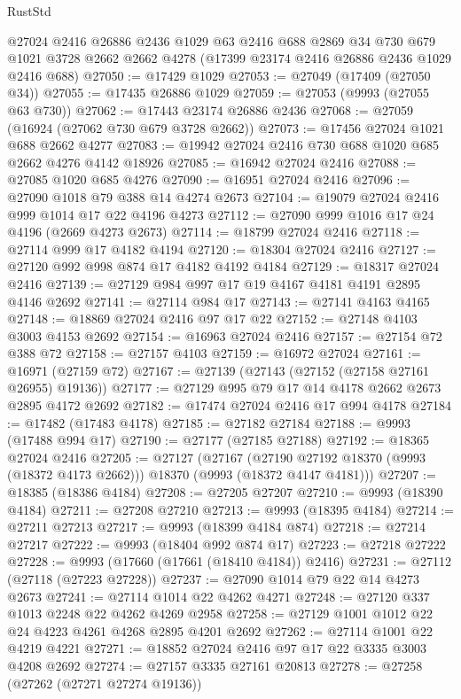 \begin{lexlean}{RustStd}
\begin{coremodule}
    @27024
    @2416
    @26886
    @2436
    @1029
    @63
    @2416
    @688
    @2869
    @34
    @730
    @679
    @1021
    @3728
    @2662
    @2662
    @4278
    (@17399 @23174 @2416 @26886 @2436 @1029 @2416 @688)
@27050 := @17429 @1029
@27053 := @27049 (@17409 (@27050 @34))
@27055 := @17435 @26886 @1029
@27059 := @27053 (@9993 (@27055 @63 @730))
@27062 := @17443 @23174 @26886 @2436
@27068 := @27059 (@16924 (@27062 @730 @679 @3728 @2662))
@27073 := @17456 @27024 @1021 @688 @2662 @4277
@27083 := @19942 @27024 @2416 @730 @688 @1020 @685 @2662 @4276 @4142 @18926
@27085 := @16942 @27024 @2416
@27088 := @27085 @1020 @685 @4276
@27090 := @16951 @27024 @2416
@27096 := @27090 @1018 @79 @388 @14 @4274 @2673
@27104 := @19079 @27024 @2416 @999 @1014 @17 @22 @4196 @4273
@27112 := @27090 @999 @1016 @17 @24 @4196 (@2669 @4273 @2673)
@27114 := @18799 @27024 @2416
@27118 := @27114 @999 @17 @4182 @4194
@27120 := @18304 @27024 @2416
@27127 := @27120 @992 @998 @874 @17 @4182 @4192 @4184
@27129 := @18317 @27024 @2416
@27139 := @27129 @984 @997 @17 @19 @4167 @4181 @4191 @2895 @4146 @2692
@27141 := @27114 @984 @17
@27143 := @27141 @4163 @4165
@27148 := @18869 @27024 @2416 @97 @17 @22
@27152 := @27148 @4103 @3003 @4153 @2692
@27154 := @16963 @27024 @2416
@27157 := @27154 @72 @388 @72
@27158 := @27157 @4103
@27159 := @16972 @27024
@27161 := @16971 (@27159 @72)
@27167 := @27139 (@27143 (@27152 (@27158 @27161 @26955) @19136))
@27177 := @27129 @995 @79 @17 @14 @4178 @2662 @2673 @2895 @4172 @2692
@27182 := @17474 @27024 @2416 @17 @994 @4178
@27184 := @17482 (@17483 @4178)
@27185 := @27182 @27184
@27188 := @9993 (@17488 @994 @17)
@27190 := @27177 (@27185 @27188)
@27192 := @18365 @27024 @2416
@27205 := @27127
    (@27167 (@27190 @27192 @18370 (@9993 (@18372 @4173 @2662))) @18370 (@9993 (@18372 @4147 @4181)))
@27207 := @18385 (@18386 @4184)
@27208 := @27205 @27207
@27210 := @9993 (@18390 @4184)
@27211 := @27208 @27210
@27213 := @9993 (@18395 @4184)
@27214 := @27211 @27213
@27217 := @9993 (@18399 @4184 @874)
@27218 := @27214 @27217
@27222 := @9993 (@18404 @992 @874 @17)
@27223 := @27218 @27222
@27228 := @9993 (@17660 (@17661 (@18410 @4184)) @2416)
@27231 := @27112 (@27118 (@27223 @27228))
@27237 := @27090 @1014 @79 @22 @14 @4273 @2673
@27241 := @27114 @1014 @22 @4262 @4271
@27248 := @27120 @337 @1013 @2248 @22 @4262 @4269 @2958
@27258 := @27129 @1001 @1012 @22 @24 @4223 @4261 @4268 @2895 @4201 @2692
@27262 := @27114 @1001 @22 @4219 @4221
@27271 := @18852 @27024 @2416 @97 @17 @22 @3335 @3003 @4208 @2692
@27274 := @27157 @3335 @27161 @20813
@27278 := @27258 (@27262 (@27271 @27274 @19136))

\end{coremodule}
\end{lexlean}
